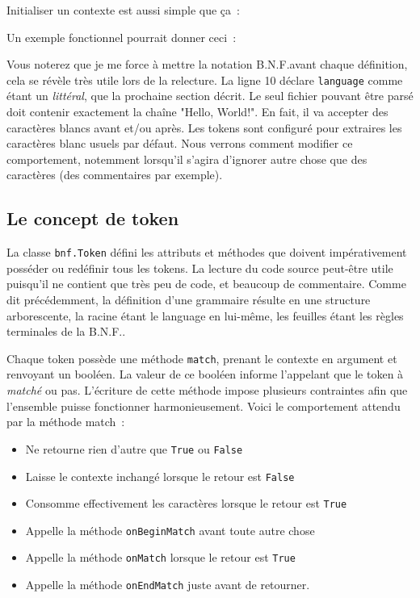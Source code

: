 \documentclass[a4paper]{article}
\newcommand{\fixed}[1]{\texttt{#1}}
\newcommand{\bnf}{B.N.F.}
\begin{document}
            Initialiser un contexte est aussi simple que ça~:

            Un exemple fonctionnel pourrait donner ceci~:

            Vous noterez que je me force à mettre la notation \bnf avant chaque
            définition, cela se révèle très utile lors de la relecture. La ligne 10
            déclare \fixed{language} comme étant un \emph{littéral}, que la
            prochaine section décrit. Le seul fichier pouvant être parsé doit
            contenir exactement la chaîne "Hello, World!". En fait, il va
            accepter des caractères blancs avant et/ou après. Les tokens sont
            configuré pour extraires les caractères blanc usuels par défaut.
            Nous verrons comment modifier ce comportement, notemment lorsqu'il
            s'agira d'ignorer autre chose que des caractères (des commentaires
            par exemple).

        \subsection{Le concept de token}
            La classe \fixed{bnf.Token} défini les attributs et méthodes que
            doivent impérativement posséder ou redéfinir tous les tokens.
            La lecture du code source peut-être utile puisqu'il ne contient
            que très peu de code, et beaucoup de commentaire.
            Comme dit précédemment, la définition
            d'une grammaire résulte en une structure arborescente, la racine
            étant le language en lui-même, les feuilles étant les règles
            terminales de la \bnf.

            Chaque token possède une méthode \fixed{match}, prenant
            le contexte en argument et renvoyant un booléen. La valeur de ce booléen
            informe l'appelant que le token à \emph{matché} ou pas. L'écriture de
            cette méthode impose plusieurs contraintes afin que l'ensemble puisse
            fonctionner harmonieusement.
            Voici le comportement attendu par la méthode match~:
            \begin{itemize}
                \item Ne retourne rien d'autre que \fixed{True} ou \fixed{False}
                \item Laisse le contexte inchangé lorsque le retour est \fixed{False}
                \item Consomme effectivement les caractères lorsque le retour est \fixed{True}
                \item Appelle la méthode \fixed{onBeginMatch} avant toute autre chose
                \item Appelle la méthode \fixed{onMatch} lorsque le retour est \fixed{True}
                \item Appelle la méthode \fixed{onEndMatch} juste avant de retourner.
            \end{itemize}
\end{document}
